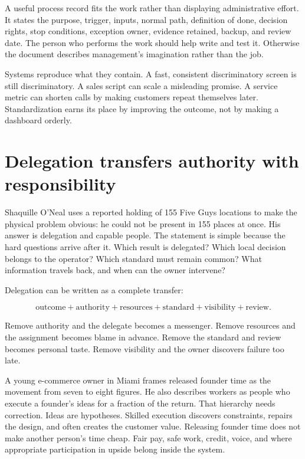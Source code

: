 A useful process record fits the work rather than displaying administrative
effort. It states the purpose, trigger, inputs, normal path, definition of done,
decision rights, stop conditions, exception owner, evidence retained, backup,
and review date. The person who performs the work should help write and test
it. Otherwise the document describes management's imagination rather than the
job.

Systems reproduce what they contain. A fast, consistent discriminatory screen
is still discriminatory. A sales script can scale a misleading promise. A
service metric can shorten calls by making customers repeat themselves later.
Standardization earns its place by improving the outcome, not by making a
dashboard orderly.

\section{Delegation transfers authority with responsibility}

Shaquille O'Neal uses a reported holding of 155 Five Guys locations to make the
physical problem obvious: he could not be present in 155 places at once. His
answer is delegation and capable people. The statement is simple because the
hard questions arrive after it. Which result is delegated? Which local decision
belongs to the operator? Which standard must remain common? What information
travels back, and when can the owner intervene?

Delegation can be written as a complete transfer:

\begin{equation}
\text{outcome} + \text{authority} + \text{resources} + \text{standard}
+ \text{visibility} + \text{review}.
\end{equation}

Remove authority and the delegate becomes a messenger. Remove resources and
the assignment becomes blame in advance. Remove the standard and review becomes
personal taste. Remove visibility and the owner discovers failure too late.

A young e-commerce owner in Miami frames released founder time as the movement
from seven to eight figures. He also describes workers as people who execute a
founder's ideas for a fraction of the return. That hierarchy needs correction.
Ideas are hypotheses. Skilled execution discovers constraints, repairs the
design, and often creates the customer value. Releasing founder time does not
make another person's time cheap. Fair pay, safe work, credit, voice, and where
appropriate participation in upside belong inside the system.

